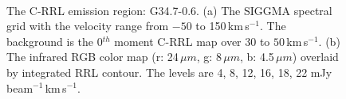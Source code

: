 \documentclass[manuscript]{aastex61}
\newcommand{\kms}{\,km\,s$^{-1}$}
\newcommand{\um}{\mu m}
\begin{document}
\begin{figure}[H]
\centering
{}
\\ 
\caption{The C-RRL emission region: G34.7-0.6.
          (a) The SIGGMA spectral grid with the velocity range from $-50$ to 150\kms.
	  The background is the 0$^{th}$ moment C-RRL map over $30$ to $50$\kms.
	  (b) The infrared RGB color map (r: 24\,$\um$, g: 8\,$\um$, b: 4.5\,$\um$) overlaid by integrated RRL contour.
	  The levels are 4, 8, 12, 16, 18, 22 mJy\,beam$^{-1}$\kms.}
\label{fig_crrl-g347}
\end{figure}
\end{document}
